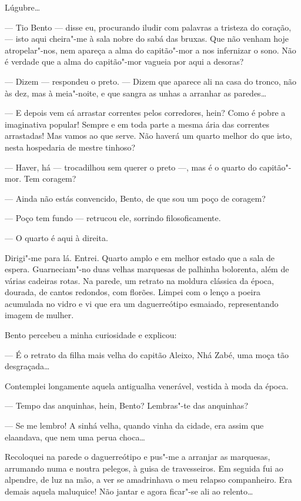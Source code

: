 Lúgubre\ldots{}

--- Tio Bento --- disse eu, procurando iludir com palavras a tristeza do
coração, --- isto aqui cheira"-me à sala nobre do sabá das bruxas. Que
não venham hoje atropelar"-nos, nem apareça a alma do capitão"-mor a nos
infernizar o sono. Não é verdade que a alma do capitão"-mor vagueia por
aqui a desoras?

--- Dizem --- respondeu o preto. --- Dizem que aparece ali na casa do
tronco, não às dez, mas à meia"-noite, e que sangra as unhas a arranhar
as paredes\ldots{}

--- E depois vem cá arrastar correntes pelos corredores, hein? Como é
pobre a imaginativa popular! Sempre e em toda parte a mesma ária das
correntes arrastadas! Mas vamos ao que serve. Não haverá um quarto
melhor do que isto, nesta hospedaria de mestre tinhoso?

--- Haver, há --- trocadilhou sem querer o preto ---, mas é o quarto do
capitão"-mor. Tem coragem?

--- Ainda não estás convencido, Bento, de que sou um poço de coragem?

--- Poço tem fundo --- retrucou ele, sorrindo filosoficamente.

--- O quarto é aqui à direita.

Dirigi"-me para lá. Entrei. Quarto amplo e em melhor estado que a sala de
espera. Guarneciam"-no duas velhas marquesas de palhinha bolorenta, além
de várias cadeiras rotas. Na parede, um retrato na moldura clássica da
época, dourada, de cantos redondos, com florões. Limpei com o lenço a
poeira acumulada no vidro e vi que era um daguerreótipo esmaiado,
representando imagem de mulher.

Bento percebeu a minha curiosidade e explicou:

--- É o retrato da filha mais velha do capitão Aleixo, Nhá Zabé, uma
moça tão desgraçada\ldots{}

Contemplei longamente aquela antigualha venerável, vestida à moda da
época.

--- Tempo das anquinhas, hein, Bento? Lembras"-te das anquinhas?

--- Se me lembro! A sinhá velha, quando vinha da cidade, era assim que
elaandava, que nem uma perua choca\ldots{}

Recoloquei na parede o daguerreótipo e pus"-me a arranjar as marquesas,
arrumando numa e noutra pelegos, à guisa de travesseiros. Em seguida fui
ao alpendre, de luz na mão, a ver se amadrinhava o meu relapso
companheiro. Era demais aquela maluquice! Não jantar e agora ficar"-se
ali ao relento\ldots{}

